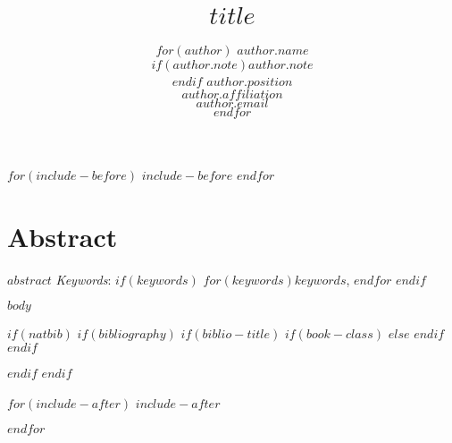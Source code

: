 \documentclass[$for(classoption)$$classoption$$sep$,$endfor$]{trbunofficial}
\title{$title$}
\author{%
  $for(author)$
  \textbf{$author.name$}\\$if(author.note)$\textit{$author.note$}\\$endif$
  $author.position$\\
  $author.affiliation$\\
  $author.email$\\
  \hfill\break
  $endfor$
}
\begin{document}
\maketitle

$for(include-before)$
$include-before$
$endfor$

\section{Abstract}
$abstract$
\hfill\break%
\hfill\break%
\noindent\textit{Keywords}: $if(keywords)$ $for(keywords)$$keywords$, $endfor$ $endif$
\newpage

$body$

\newpage
$if(natbib)$
$if(bibliography)$
$if(biblio-title)$
$if(book-class)$
\renewcommand\bibname{$biblio-title$}
$else$
\renewcommand\refname{$biblio-title$}
$endif$
$endif$


$endif$
$endif$

$for(include-after)$
$include-after$

$endfor$
\end{document}

